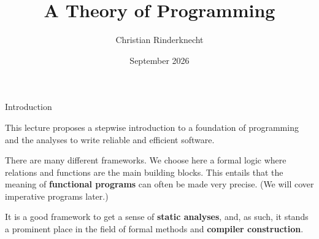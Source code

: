 \documentclass[compress,dvips,xcolor={dvipsnames},t]{beamer}
\title{\LARGE A Theory of Programming}
\author{\Large Christian Rinderknecht}
\institute{\normalsize Eszterházy Károly Katolikus Egyetem}
\date{September 2026}
\begin{document}
\frame{\maketitle}

%
\begin{frame}{Introduction}

  This lecture proposes a stepwise introduction to a foundation of
  programming and the analyses to write reliable and efficient
  software.

  \bigskip

  There are many different frameworks. We choose here a formal logic
  where relations and functions are the main building blocks. This
  entails that the meaning of \textbf{functional programs} can often
  be made very precise. (We will cover imperative programs later.)

  \bigskip

  It is a good framework to get a sense of \textbf{static analyses},
  and, as such, it stands a prominent place in the field of formal
  methods and \textbf{compiler construction}.

\end{frame}




















\end{document}
